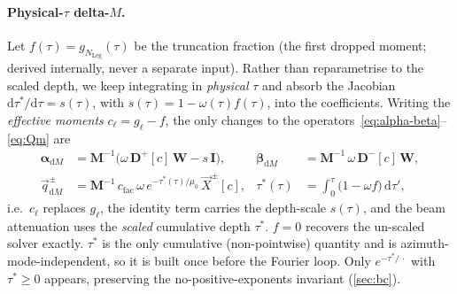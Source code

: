 \documentclass[11pt,a4paper]{article}
\newcommand{\mat}[1]{\mathbf{#1}}
\theoremstyle{definition}
\begin{document}
\paragraph{Physical-$\tau$ delta-$M$.}
Let $f(\tau)=g_{N_{\mathrm{Leg}}}(\tau)$ be the truncation fraction (the first
dropped moment; derived internally, never a separate input).  Rather than
reparametrise to the scaled depth, we keep integrating in \emph{physical} $\tau$
and absorb the Jacobian $\mathrm{d}\tau^\ast/\mathrm{d}\tau=s(\tau)$, with
$s(\tau)=1-\omega(\tau)f(\tau)$, into the coefficients.  Writing the
\emph{effective moments} $c_\ell=g_\ell-f$, the only changes to the
operators~\eqref{eq:alpha-beta}--\eqref{eq:Qm} are
\begin{align}
  \mat{\alpha}_{\mathrm{d}M} &= \mat{M}^{-1}\!\big(\omega\,\mat{D}^{+}[c]\,\mat{W}
      - s\,\mat{I}\big), &
  \mat{\beta}_{\mathrm{d}M} &= \mat{M}^{-1}\,\omega\,\mat{D}^{-}[c]\,\mat{W},
  \nonumber\\
  \vec{q}^{\pm}_{\mathrm{d}M} &= \mat{M}^{-1}\,c_{\mathrm{fac}}\,\omega\,
      e^{-\tau^\ast(\tau)/\mu_0}\,\vec{X}^{\pm}[c], &
  \tau^\ast(\tau) &= \int_0^\tau \!\big(1-\omega f\big)\,\mathrm{d}\tau' ,
  \label{eq:deltaM}
\end{align}
i.e.\ $c_\ell$ replaces $g_\ell$, the identity term carries the depth-scale
$s(\tau)$, and the beam attenuation uses the \emph{scaled} cumulative depth
$\tau^\ast$.  $f=0$ recovers the un-scaled solver exactly.  $\tau^\ast$ is the
only cumulative (non-pointwise) quantity and is azimuth-mode-independent, so it
is built once before the Fourier loop.  Only $e^{-\tau^\ast/\,\cdot}$ with
$\tau^\ast\!\ge\!0$ appears, preserving the no-positive-exponents invariant
(\cref{sec:bc}).
\end{document}
